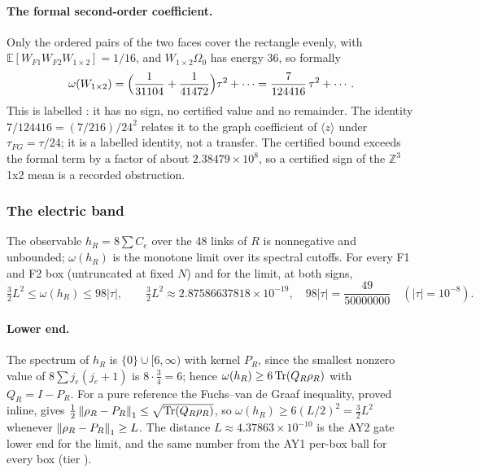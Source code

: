 \paragraph{The formal second-order coefficient.} Only the ordered pairs of
the two faces cover the rectangle evenly, with
$\mathbb E[W_{F1}W_{F2}W_{1\times2}]=1/16$, and $W_{1\times2}\Omega_0$ has energy
36, so formally
\begin{equation}
 \omega(W_{1\times2})=\Bigl(\frac1{31104}+\frac1{41472}\Bigr)\tau^2+\cdots=\frac7{124416}\,\tau^2+\cdots .
 \label{eq:bd2-formal}
\end{equation}
This is labelled : it has no sign, no
certified value and no remainder. The identity $7/124416=(7/216)/24^2$
relates it to the graph coefficient of $\langle z\rangle$ under
$\tau_{FG}=\tau/24$; it is a labelled identity, not a transfer. The certified
bound exceeds the formal term by a factor of about $2.38479\times10^8$, so a
certified sign of the $\mathbb Z^3$ 1x2 mean is a recorded obstruction.

\subsubsection{The electric band}
\label{sec:bd2-band}
The observable $h_R=8\sum C_e$ over the 48 links of $R$ is nonnegative and
unbounded; $\omega(h_R)$ is the monotone limit over its spectral cutoffs. For
every F1 and F2 box (untruncated at fixed $N$) and for the limit, at both
signs,
\begin{equation}
 \tfrac32L^2\le\omega(h_R)\le98|\tau|,\qquad
 \tfrac32L^2\approx2.87586637818\times10^{-19},\quad98|\tau|=\frac{49}{50000000}\quad(|\tau|=10^{-8}).
 \label{eq:bd2-band}
\end{equation}

\paragraph{Lower end.} The spectrum of $h_R$ is $\{0\}\cup[6,\infty)$ with
kernel $P_R$, since the smallest nonzero value of $8\sum j_e(j_e+1)$ is
$8\cdot\tfrac34=6$; hence $\omega(h_R)\ge6\operatorname{Tr}(Q_R\rho_R)$ with $Q_R=I-P_R$. For a
pure reference the Fuchs--van de Graaf inequality, proved inline, gives
$\tfrac12\left\lVert\rho_R-P_R\right\rVert_1\le\sqrt{\operatorname{Tr}(Q_R\rho_R)}$, so
$\omega(h_R)\ge6(L/2)^2=\tfrac32L^2$ whenever $\left\lVert\rho_R-P_R\right\rVert_1\ge L$. The
distance $L\approx4.37863\times10^{-10}$ is the AY2 gate lower end for the
limit, and the same number from the AY1 per-box ball for every box (tier
).

